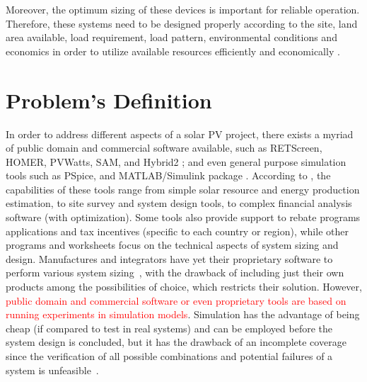 Moreover, the optimum sizing of these devices is important for reliable operation. Therefore, these systems need to be designed properly according to the site, land area available, load requirement, load pattern, environmental conditions and economics in order to utilize available resources efficiently and economically \cite{Rawat}.

\section{Problem's Definition}

In order to address different aspects of a solar PV project, there exists a myriad of public domain and commercial software available, such as RETScreen, HOMER, PVWatts, SAM, and Hybrid2 \cite{Pradhan,Swarnkar,NRELDobos,NRELBlair,Mills}; and even general purpose simulation tools such as PSpice, and MATLAB/Simulink package \cite{Gow1999,Benatiallah2017}. According to \cite{Brooks}, the capabilities of these tools range from simple solar resource and energy production estimation, to site survey and system design tools, to complex financial analysis software (with optimization). Some tools also provide support to rebate programs applications and tax incentives (specific to each country or region), while other programs and worksheets focus on the technical aspects of system sizing and design.  
%
Manufactures and integrators have yet their proprietary software to perform various system sizing\textcolor{red}{~\cite{Zhou2010}}, with the drawback of including just their own products among the possibilities of choice, which restricts their solution. 
%
However, \textcolor{red}{public domain and commercial software or even proprietary tools are based on running experiments in simulation models}. Simulation has the advantage of being cheap (if compared to test in real systems) and can be employed before the system design is concluded, but it has the drawback of an incomplete coverage since the verification of all possible combinations and potential failures of a system is unfeasible~\cite{ClarkeHV18}.

